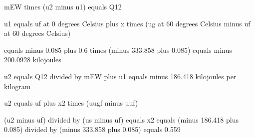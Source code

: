 mEW times (u2 minus u1) equals Q12

u1 equals uf at 0 degrees Celsius plus x times (ug at 60 degrees Celsius minus uf at 60 degrees Celsius)

equals minus 0.085 plus 0.6 times (minus 333.858 plus 0.085) equals minus 200.0928 kilojoules

u2 equals Q12 divided by mEW plus u1 equals minus 186.418 kilojoules per kilogram

u2 equals uf plus x2 times (uugf minus uuf)

(u2 minus uf) divided by (us minus uf) equals x2 equals (minus 186.418 plus 0.085) divided by (minus 333.858 plus 0.085) equals 0.559